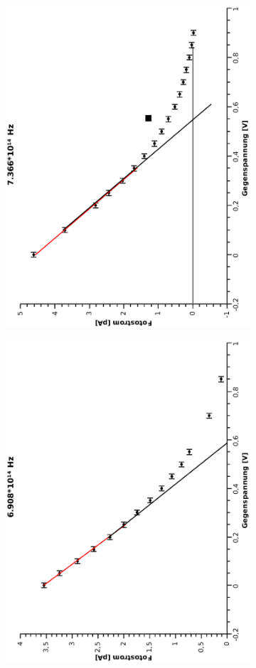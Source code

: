 \documentclass[12pt,a4paper,twopage]{article}
\begin{document}
\begin{figure}
\begin{subfigure}{0.48\linewidth}
\end{subfigure}
\begin{subfigure}{0.48\textwidth}
\includegraphics[width=0.75\linewidth, angle=-90]{7366.eps}
\end{subfigure}
\begin{subfigure}{0.48\textwidth}
\includegraphics[width=0.75\linewidth, angle=-90]{6908.eps}

\end{subfigure}
\end{figure}
\end{document}
